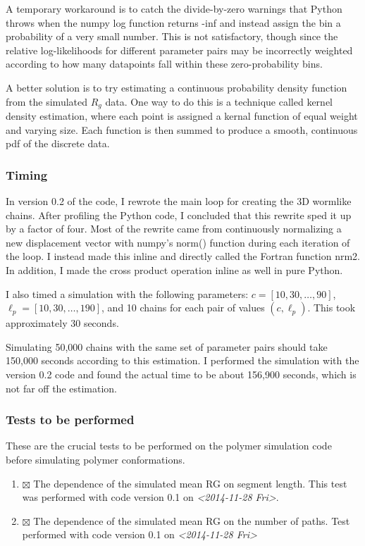 \documentclass[11pt]{article}
\begin{document}
A temporary workaround is to catch the divide-by-zero warnings
that Python throws when the numpy log function returns -inf and
instead assign the bin a probability of a very small number. This
is not satisfactory, though since the relative log-likelihoods for
different parameter pairs may be incorrectly weighted according to
how many datapoints fall within these zero-probability bins.

A better solution is to try estimating a continuous probability
density function from the simulated $R_g$ data. One way to do this
is a technique called kernel density estimation, where each point
is assigned a kernal function of equal weight and varying
size. Each function is then summed to produce a smooth, continuous
pdf of the discrete data.

\subsubsection{Timing}
\label{sec-3-3-3}
In version 0.2 of the code, I rewrote the main loop for creating
the 3D wormlike chains. After profiling the Python code, I
concluded that this rewrite sped it up by a factor of four. Most
of the rewrite came from continuously normalizing a new
displacement vector with numpy's norm() function during each
iteration of the loop. I instead made this inline and directly
called the Fortran function nrm2. In addition, I made the cross
product operation inline as well in pure Python.

I also timed a simulation with the following parameters: $c =
    \left[10, 30, \ldots , 90\right]$, $\ell_p = \left[ 10, 30,
    \ldots, 190 \right]$, and 10 chains for each pair of values
$\left(c, \ell_p\right)$.  This took approximately 30 seconds.

Simulating 50,000 chains with the same set of parameter pairs
should take 150,000 seconds according to this estimation. I
performed the simulation with the version 0.2 code and found the
actual time to be about 156,900 seconds, which is not far off the
estimation.
\subsubsection{Tests to be performed}
\label{sec-3-3-4}
These are the crucial tests to be performed on the polymer simulation
code before simulating polymer conformations.

\begin{enumerate}
\item $\boxtimes$ The dependence of the simulated mean RG on segment length.
This test was performed with code version 0.1 on \textit{<2014-11-28 Fri>}.
\item $\boxtimes$ The dependence of the simulated mean RG on the number of
paths. Test performed with code version 0.1 on \textit{<2014-11-28 Fri>}
\end{enumerate}

\printbibliography
\end{document}
